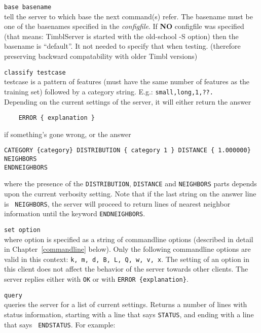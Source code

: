 \documentclass{report}
\begin{document}
\begin{description}
\item {\tt base basename}\\
  tell the server to which base the next command(s) refer. The
  basename must be one of the basenames specified in the {\em
    configfile}.  If {\bf NO} configfile was specified (that means:
  TimblServer is started with the old-school -S option) then the
  basename is ``default''. It not needed to specify that when
  testing. (therefore preserving backward compatability with older
  Timbl versions)

\item {\tt classify testcase}\\
  testcase is a pattern of features (must have the same number of
  features as the training set) followed by a category
  string. E.g.: {\tt small,long,1,??.}\\
  Depending on the current settings of the server, it will either
  return the answer
      \begin{verbatim}
	ERROR { explanation }
      \end{verbatim}
      if something's gone wrong, or the answer
      \begin{verbatim}
CATEGORY {category} DISTRIBUTION { category 1 } DISTANCE { 1.000000} NEIGHBORS
ENDNEIGHBORS
      \end{verbatim}
      where the presence of the {\tt DISTRIBUTION}, {\tt DISTANCE} and
      {\tt NEIGHBORS} parts depends upon the current verbosity
      setting. Note that if the last string on the answer line is {\tt
        NEIGHBORS}, the server will proceed to return lines of nearest
      neighbor information until the keyword {\tt ENDNEIGHBORS}.
\item {\tt set option}\\ where option is specified as a string of
      commandline options (described in detail in
      Chapter~\ref{commandline} below). Only the following commandline
      options are valid in this context: {\tt k, m, d, B, L, Q, w, v,
      x}. The setting of an option in this client does not affect the
      behavior of the server towards other clients. The server replies
      either with {\tt OK} or with {\tt ERROR \{explanation\}}.
    \item {\tt query}\\
      queries the server for a list of current settings. Returns a
      number of lines with status information, starting with a line
      that says {\tt STATUS}, and ending with a line that says {\tt
        ENDSTATUS}. For example:


\end{description}
\end{document}
